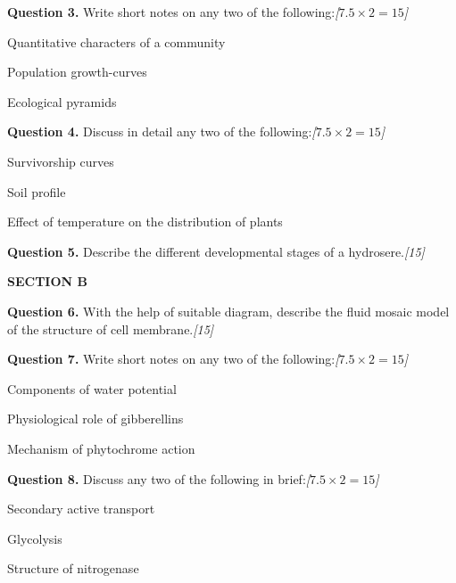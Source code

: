 \documentclass[11pt,a4paper]{article}
\newcommand{\pts}[1]{\hfill   \textit{[#1]}}
\begin{document}
\medskip


\noindent   \textbf{Question 3.} Write short notes on any two of the following:\pts{$7.5  \times 2 = 15$}

\begin{parts}
  \item Quantitative characters of a community
  \item Population growth-curves
  \item Ecological pyramids
\end{parts}

\medskip


\noindent   \textbf{Question 4.} Discuss in detail any two of the following:\pts{$7.5  \times 2 = 15$}

\begin{parts}
  \item Survivorship curves
  \item Soil profile
  \item Effect of temperature on the distribution of plants
\end{parts}

\medskip


\noindent   \textbf{Question 5.} Describe the different developmental stages of a hydrosere.\pts{15}

\bigskip

\begin{center}
   \textbf{SECTION B}
\end{center}
\medskip

\medskip


\noindent   \textbf{Question 6.} With the help of suitable diagram, describe the fluid mosaic model of the structure of cell membrane.\pts{15}

\medskip


\noindent   \textbf{Question 7.} Write short notes on any two of the following:\pts{$7.5  \times 2 = 15$}

\begin{parts}
  \item Components of water potential
  \item Physiological role of gibberellins
  \item Mechanism of phytochrome action
\end{parts}

\medskip


\noindent   \textbf{Question 8.} Discuss any two of the following in brief:\pts{$7.5  \times 2 = 15$}

\begin{parts}
  \item Secondary active transport
  \item Glycolysis
  \item Structure of nitrogenase
\end{parts}
\end{document}
